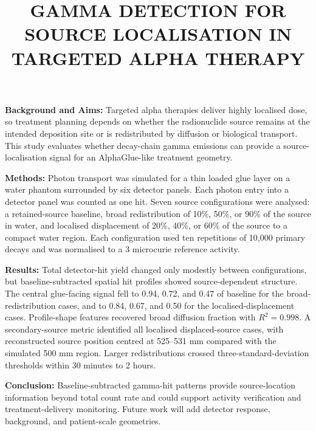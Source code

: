 \documentclass[11pt,a4paper]{article}
\title{GAMMA DETECTION FOR SOURCE LOCALISATION IN TARGETED ALPHA THERAPY}
\author{}
\date{}
\begin{document}
\maketitle
\sloppy

\textbf{Background and Aims:} Targeted alpha therapies deliver highly localised dose, so treatment planning depends on whether the radionuclide source remains at the intended deposition site or is redistributed by diffusion or biological transport. This study evaluates whether decay-chain gamma emissions can provide a source-localisation signal for an AlphaGlue-like treatment geometry.

\textbf{Methods:} Photon transport was simulated for a thin loaded glue layer on a water phantom surrounded by six detector panels. Each photon entry into a detector panel was counted as one hit. Seven source configurations were analysed: a retained-source baseline, broad redistribution of 10\%, 50\%, or 90\% of the source in water, and localised displacement of 20\%, 40\%, or 60\% of the source to a compact water region. Each configuration used ten repetitions of 10,000 primary decays and was normalised to a 3 microcurie reference activity.

\textbf{Results:} Total detector-hit yield changed only modestly between configurations, but baseline-subtracted spatial hit profiles showed source-dependent structure. The central glue-facing signal fell to 0.94, 0.72, and 0.47 of baseline for the broad-redistribution cases, and to 0.84, 0.67, and 0.50 for the localised-displacement cases. Profile-shape features recovered broad diffusion fraction with \(R^2=0.998\). A secondary-source metric identified all localised displaced-source cases, with reconstructed source position centred at 525--531 mm compared with the simulated 500 mm region. Larger redistributions crossed three-standard-deviation thresholds within 30 minutes to 2 hours.

\textbf{Conclusion:} Baseline-subtracted gamma-hit patterns provide source-location information beyond total count rate and could support activity verification and treatment-delivery monitoring. Future work will add detector response, background, and patient-scale geometries.
\end{document}
